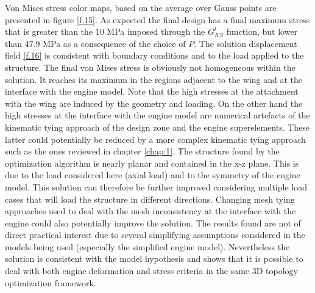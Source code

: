  Von Mises stress color maps, based on the average over Gauss points are presented in figure \ref{f.15}.
  As expected the final design has a final maximum stress that is greater than the 10 MPa imposed through the $G_{KS}^l$ function, but lower than 47.9 MPa as a consequence of the choice of $P$.
  The solution displacement field \ref{f.16} is consistent with boundary conditions and to the load applied to the structure. The final von Mises stress is obviously not homogeneous within the solution. It reaches its maximum in the regions adjacent to the wing and at the interface with the engine model. Note that the high stresses at the attachment with the wing are induced by the geometry and loading. On the other hand the high stresses at the interface with the engine model are numerical artefacts of the kinematic tying approach of the design zone and the engine superelements. These latter could potentially be reduced by a more complex kinematic tying approach such as the ones reviewed in chapter \ref{chap:1}.
  The structure found by the optimization algorithm is nearly planar and contained in the x-z plane. This is due to the load considered here (axial load) and to the symmetry of the engine model. This solution can therefore be further improved considering multiple load cases that will load the structure in different directions. Changing mesh tying approaches used to deal with the mesh inconsistency at the interface with the engine could also potentially improve the solution. The results found are not of direct practical interest due to several simplifying assumptions considered in the models being used (especially the simplified engine model).  Nevertheless the solution is consistent with the model hypothesis and shows that it is possible to deal with both engine deformation and stress criteria in the same 3D topology optimization framework.
